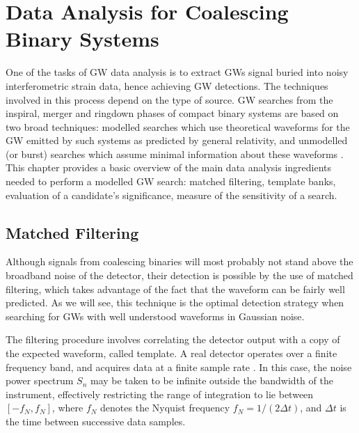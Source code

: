 \documentclass[binding=0.6cm, LaM]{sapthesis}
\begin{document}
\chapter{Data Analysis for Coalescing Binary Systems}
\label{ch:datatools}
	One of the tasks of GW data analysis is to extract GWs signal 
	buried into noisy interferometric strain data, hence achieving GW detections.
	The techniques involved in this process depend on the type of source.
	GW searches from the inspiral, merger and ringdown phases of compact binary systems 
	are based on two broad techniques: 
	modelled searches which use theoretical waveforms for the GW emitted by such systems 
	as predicted by general relativity, and 
	unmodelled (or burst) searches which assume minimal information about these waveforms \cite{23}.
        This chapter provides a basic overview of the main data analysis ingredients needed to perform a modelled GW search:
        matched filtering, template banks, evaluation of a candidate's significance, measure of the sensitivity of a search.

\section{Matched Filtering}
\label{sec:matched_filtering}
	Although signals from coalescing binaries will most probably not stand above the broadband noise of the detector, 
	their detection is possible by the use of matched filtering, 
	which takes advantage of the fact that the waveform can be fairly well predicted. 
	As we will see, this technique is the optimal detection strategy when searching for GWs
        with well understood waveforms in Gaussian noise.

	The filtering procedure involves correlating the detector output 
	with a copy of the expected waveform, 
	called template.
	A real detector operates over a finite frequency band, 
	and acquires data at a finite sample rate \cite{24}. 
	In this case, the noise power spectrum $S_n$ 
	may be taken to be infinite outside the bandwidth of the instrument, 
	effectively restricting the range of integration to lie between $[-f_N, f_N]$, 
	where $f_N$ denotes the Nyquist frequency $f_N = 1/(2\Delta t)$, 
	and $\Delta t$ is the time between successive data samples.
\end{document}
